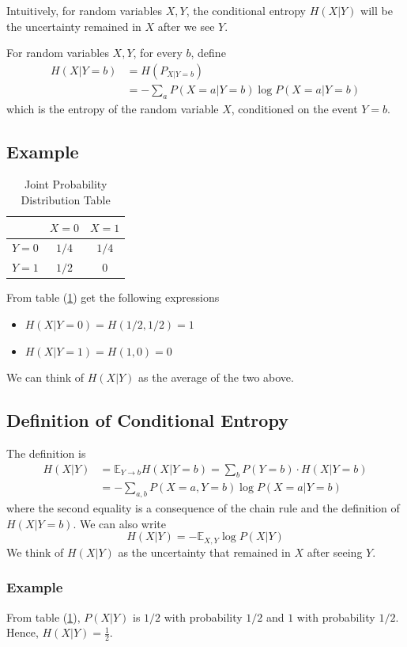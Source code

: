 \documentclass{article}
\begin{document}
Intuitively, for random variables $X,Y$, the conditional entropy $H(X|Y)$ will be the uncertainty remained in $X$ after we see $Y$.

For random variables $X,Y$, for every $b$, define 
\begin{align*}
    H(X| Y=b)&= H(P_{X|Y=b})\\
    &= -\sum_a P\left(X=a | Y=b\right)\log P\left(X=a | Y=b\right)
\end{align*}
which is the entropy of the random variable $X$, conditioned on the event $Y=b$.

\subsection{Example}

\begin{table}[h]
\centering
\begin{tabular}{|c|c|c|}
\hline
& $X=0$ & $X=1$ \\ \hline
$Y=0 $ & $1/4$ & $1/4$  \\ \hline
$Y=1$ & $1/2$ & 0  \\ \hline
\end{tabular}
\caption{Joint Probability Distribution Table}
\label{tab:joint_prob_dist}
\end{table}

From table (\ref{tab:joint_prob_dist}) get the following expressions
\begin{itemize}
    \item $H(X|Y=0)=H(1/2,1/2)=1$
    \item $H(X|Y=1)=H(1,0)=0$
\end{itemize}
We can think of $H(X|Y)$ as the average of the two above.

\subsection{Definition of Conditional Entropy}

The definition is 
\begin{align}
    H(X|Y) &= \mathbb{E}_{Y\to b} H(X|Y=b)=\sum_b P(Y=b)\cdot H(X|Y=b)\\
    &= -\sum_{a,b} P(X=a,Y=b)\log P(X=a|Y=b)
\end{align}
where the second equality is a consequence of the chain rule and the definition of $H(X| Y=b)$. We can also write 
\begin{equation}
    H(X|Y)= -\mathbb{E}_{X,Y}\log P(X|Y)
\end{equation}
We think of $H(X|Y)$ as the uncertainty that remained in $X$ after seeing $Y$.

\subsubsection{Example}

From table (\ref{tab:joint_prob_dist}), $P(X|Y)$ is $1/2$ with probability $1/2$ and $1$ with probability $1/2$. Hence, $H(X|Y)=\frac{1}{2}$.
\end{document}

